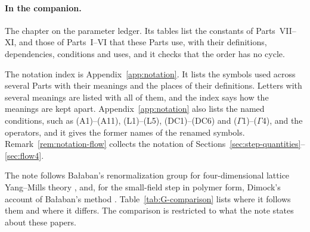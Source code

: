\paragraph{In the companion.} The chapter on the parameter ledger. Its tables list the constants of Parts~VII--XI, and those of Parts~I--VI that these Parts use, with their definitions, dependencies, conditions and uses, and it checks that the order has no cycle.

\label{g:notation}

The notation index is Appendix~\ref{app:notation}. It lists the symbols used across several Parts with their meanings and the places of their definitions. Letters with several meanings are listed with all of them, and the index says how the meanings are kept apart. Appendix~\ref{app:notation} also lists the named conditions, such as (A1)--(A11), (L1)--(L5), (DC1)--(DC6) and ($\Gamma$1)--($\Gamma$4), and the operators, and it gives the former names of the renamed symbols. Remark~\ref{rem:notation-flow} collects the notation of Sections~\ref{sec:step-quantities}--\ref{sec:flow4}.

\label{g:comparison}

The note follows Ba\l aban's renormalization group for four-dimensional lattice Yang--Mills theory \cite{BalPropI,BalPropII,BalAvg,BalReg,BalBackground,BalVar,BalYM4I,BalYM4II}, and, for the small-field step in polymer form, Dimock's account of Ba\l aban's method \cite{DimockI}. Table~\ref{tab:G-comparison} lists where it follows them and where it differs. The comparison is restricted to what the note states about these papers.

